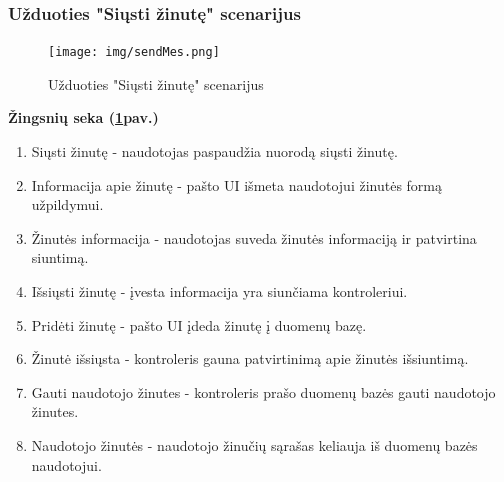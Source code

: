 \documentclass{VUMIFPSkursinis}
\begin{document}
\subsubsection{Užduoties "Siųsti žinutę" scenarijus}
\begin{figure}[H]
	\centering
	\texttt{[image: img/sendMes.png]}
	\caption{Užduoties "Siųsti žinutę" scenarijus}
	\label{fig:sendMess}
\end{figure}
\textbf{Žingsnių seka (\ref{fig:sendMess}pav.)}\\
\begin{enumerate}
	\item Siųsti žinutę - naudotojas paspaudžia nuorodą siųsti žinutę.
	\item Informacija apie žinutę - pašto UI išmeta naudotojui žinutės formą užpildymui.
	\item Žinutės informacija - naudotojas suveda žinutės informaciją ir patvirtina siuntimą.
	\item Išsiųsti žinutę - įvesta informacija yra siunčiama kontroleriui.
	\item Pridėti žinutę - pašto UI įdeda žinutę į duomenų bazę.
	\item Žinutė išsiųsta - kontroleris gauna patvirtinimą apie žinutės išsiuntimą.
	\item Gauti naudotojo žinutes - kontroleris prašo duomenų bazės gauti naudotojo žinutes.
	\item Naudotojo žinutės - naudotojo žinučių sąrašas keliauja iš duomenų bazės naudotojui.
\end{enumerate}
\end{document}
